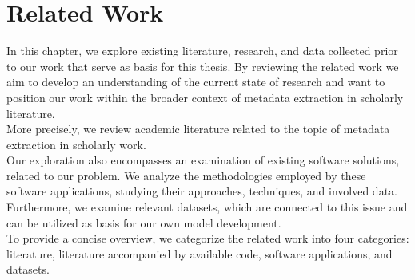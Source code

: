 \chapter{Related Work}\label{chap:related}
In this chapter, we explore existing literature, research, and data collected prior to our work that serve as basis for this thesis. By reviewing the related work we aim to develop an understanding of the current state of research and want to position our work within the broader context of metadata extraction in scholarly literature.\\
More precisely, we review academic literature related to the topic of metadata extraction in scholarly work.\\
Our exploration also encompasses an examination of existing software solutions, related to our problem. We analyze the methodologies employed by these software applications, studying their approaches, techniques, and involved data.\\
Furthermore, we examine relevant datasets, which are connected to this issue and can be utilized as basis for our own model development.\\
To provide a concise overview, we categorize the related work into four categories: literature, literature accompanied by available code, software applications, and datasets.

